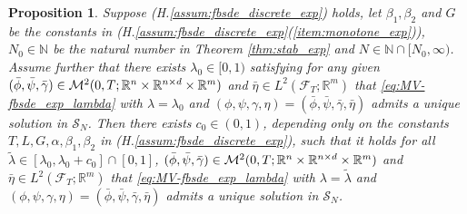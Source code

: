 \documentclass[11pt]{article}
\numberwithin{equation}{section}
\newtheorem{Proposition}[Theorem]{Proposition}
\theoremstyle{definition}
\theoremstyle{remark}
\def\l{\label}  \def\f{\frac}  \def\fa{\forall}
\def\b{\beta}  \def\a{\alpha} \def\ga{\gamma}
\def\cF{\mathcal{F}}
\def\cM{\mathcal{M}}
\def\cS{\mathcal{S}}
\def\sN{{\mathbb{N}}}
\def\sR{{\mathbb R}}
\begin{document}
\begin{Proposition}\l{prop:moc_bwd_imp}
Suppose  (H.\ref{assum:fbsde_discrete_exp}) holds,
 let $\b_1,\b_2$ and $G$ be the constants in  (H.\ref{assum:fbsde_discrete_exp}(\ref{item:monotone_exp})),
  $N_0\in \sN$ be  the  natural number in Theorem \ref{thm:stab_exp}
  and $N\in\sN\cap[ N_0,\infty)$.
Assume further that there exists $\lambda_0\in [0,1)$ satisfying
for any given 
$(\bar{\phi},\bar{\psi},\bar{\gamma})\in \cM^2(0,T; \sR^n\t \sR^{n\t d}\t \sR^m)$ and  $\bar{\eta}\in L^2(\cF_T;\sR^m)$
that \eqref{eq:MV-fbsde_exp_lambda} with $\lambda=\lambda_0$
and $(\phi,\psi,\gamma,\eta)=(\bar{\phi},\bar{\psi},\bar{\gamma},\bar{\eta})$
 admits a unique solution in $\cS_N$.
Then there exists $c_0\in (0,1)$, depending only on the constants 
$T,L,G,\a,\b_1,\b_2$
in (H.\ref{assum:fbsde_discrete_exp}),
such that
it holds 
 for all $\tilde{\lambda}\in [\lambda_0,\lambda_0+c_0]\cap [0,1]$,
$(\bar{\phi},\bar{\psi},\bar{\gamma})\in \cM^2(0,T; \sR^n\t \sR^{n\t d}\t \sR^m)$ and  $\bar{\eta}\in L^2(\cF_T;\sR^m)$
that
 \eqref{eq:MV-fbsde_exp_lambda} 
 with $\lambda=\tilde{\lambda}$
and $(\phi,\psi,\gamma,\eta)=(\bar{\phi},\bar{\psi},\bar{\gamma},\bar{\eta})$
 admits a unique solution in $\cS_N$.
\end{Proposition}
\end{document}
